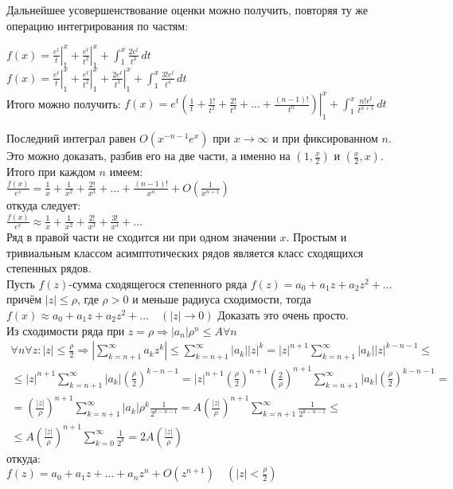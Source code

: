 \documentclass{report}
\begin{document}
Дальнейшее усовершенствование оценки можно получить, повторяя ту же операцию интегрирования по частям: \\
\begin{center}
$f(x)=\left.\frac{e^{t}}{t}\right\vert_{1}^{x}+\left.\frac{e^{t}}{t^{2}}\right\vert_{1}^{x}+\int_{1}^{x}\frac{2e^{t}}{t^{3}}\,dt$ \\
$f(x)=\left.\frac{e^{t}}{t}\right\vert_{1}^{x}+\left.\frac{e^{t}}{t^{2}}\right\vert_{1}^{x}+\left.\frac{2e^{t}}{t^{3}}\right\vert_{1}^{x} +\int_{1}^{x}\frac{3!e^{t}}{t^{4}}\,dt$ \\
Итого можно получить:
$f(x)=\left.e^{t}\left(\frac{1}{t}+\frac{1!}{t^{2}}+\frac{2!}{t^{3}}+\dots+\frac{(n-1)!}{t^{n}}\right)\right\vert_{1}^{x}+\int_{1}^{x}\frac{n!e^{t}}{t^{n+1}}\,dt$
\end{center}
Последний интеграл равен $O(x^{-n-1}e^{x})$ при $x\to\infty$ и при фиксированном $n$. Это можно доказать, разбив его на две части, а именно на $\left(1,\frac{x}{2}\right)$ 
и $\left(\frac{x}{2},x\right)$. \\
Итого при каждом $n$ имеем:\\
$\frac{f(x)}{e^{x}}=\frac{1}{x}+\frac{1}{x^{2}}+\frac{2!}{x^{3}}+\dots+\frac{(n-1)!}{x^{n}}+O\left(\frac{1}{x^{n+1}}\right)$ \\
откуда следует: \\
$\frac{f(x)}{e^{x}}\approx\frac{1}{x}+\frac{1}{x^{2}}+\frac{2!}{x^{3}}+\frac{3!}{x^{4}}+\dots$ \\
Ряд в правой части не сходится ни при одном значении $x$.  
Простым и тривиальным классом асимптотических рядов является класс сходящихся степенных рядов. \\
Пусть $f(z)$-сумма сходящегося степенного ряда $f(z)=a_0+a_1z+a_2z^{2}+\dots$ \\
причём $|z|\le\rho$, где $\rho>0$ и меньше радиуса сходимости, тогда \\
$f(x)\approx a_0+a_1z+a_2z^{2}+\dots\quad(|z|\to 0)$
Доказать это очень просто. \\
Из сходимости ряда при $z=\rho\Rightarrow|a_n|\rho^{n}\le A\forall n$ \\

\begin{multline}
        \forall n \forall z: |z|\le\frac{\rho}{2}\Rightarrow{\left\vert\sum_{k=n+1}^{\infty}a_k z^{k}\right\vert}\le 
        \sum_{k=n+1}^{\infty}|a_k||z|^{k}=
        |z|^{n+1}\sum_{k=n+1}^{\infty}|a_k||z|^{k-n-1}\le \\
        \le |z|^{n+1}\sum_{k=n+1}^{\infty}|a_k|\left(\frac{\rho}{2}\right)^{k-n-1}=
        |z|^{n+1}\left(\frac{\rho}{2}\right)^{n+1}\left(\frac{2}{\rho}\right)^{n+1}\sum_{k=n+1}^{\infty}|a_k|\left(\frac{\rho}{2}\right)^{k-n-1} = \\
        =\left(\frac{|z|}{\rho}\right)^{n+1}\sum_{k=n+1}^{\infty}|a_k|\rho^{k}\frac{1}{2^{k-n-1}} =
        A\left(\frac{|z|}{\rho}\right)^{n+1}\sum_{k=n+1}^{\infty}\frac{1}{2^{k-n-1}} \le \\
        \le A\left(\frac{|z|}{\rho}\right)^{n+1}\sum_{k=0}^{\infty}\frac{1}{2^{k}} = 2A\left(\frac{|z|}{\rho}\right)
\end{multline}
откуда: \\
$f(z)=a_0+a_1z+\dots+a_nz^{n}+O(z^{n+1})\quad(|z|<\frac{\rho}{2})$ \newpage
\end{document}
